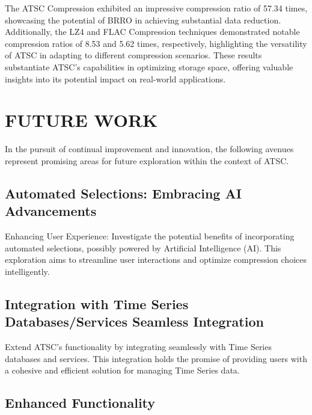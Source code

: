 \documentclass[conference]{IEEEtran}
\begin{document}

\vspace{10pt}
The ATSC Compression exhibited an impressive compression ratio of 57.34 times, showcasing the potential of BRRO in achieving substantial data reduction. Additionally, the LZ4 and FLAC Compression techniques demonstrated notable compression ratios of 8.53 and 5.62 times, respectively, highlighting the versatility of ATSC in adapting to different compression scenarios. 
These results substantiate ATSC's capabilities in optimizing storage space, offering valuable insights into its potential impact on real-world applications. 

\section{FUTURE WORK}

In the pursuit of continual improvement and innovation, the following avenues represent promising areas for future exploration within the context of ATSC.

\subsection{Automated Selections: Embracing AI Advancements}

Enhancing User Experience: Investigate the potential benefits of incorporating automated selections, possibly powered by Artificial Intelligence (AI). This exploration aims to streamline user interactions and optimize compression choices intelligently.

\subsection*{Integration with Time Series Databases/Services Seamless Integration}

Extend ATSC's functionality by integrating seamlessly with Time Series databases and services. This integration holds the promise of providing users with a cohesive and efficient solution for managing Time Series data.

\subsection{Enhanced Functionality}
\end{document}
